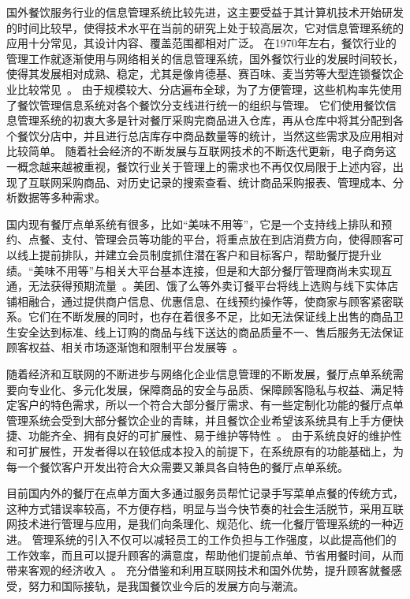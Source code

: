 国外餐饮服务行业的信息管理系统比较先进，这主要受益于其计算机技术开始研发的时间比较早，使得技术水平在当前的研究上处于较高层次，它对信息管理系统的应用十分常见，其设计内容、覆盖范围都相对广泛。
在1970年左右，餐饮行业的管理工作就逐渐使用与网络相关的信息管理系统，国外餐饮行业的发展时间较长，使得其发展相对成熟、稳定，尤其是像肯德基、赛百味、麦当劳等大型连锁餐饮企业比较常见~\cite{garrett2018mobile}。
由于规模较大、分店遍布全球，为了方便管理，这些机构率先使用了餐饮管理信息系统对各个餐饮分支线进行统一的组织与管理。
它们使用餐饮信息管理系统的初衷大多是针对餐厅采购完商品进入仓库，再从仓库中将其分配到各个餐饮分店中，并且进行总店库存中商品数量等的统计，当然这些需求及应用相对比较简单。
随着社会经济的不断发展与互联网技术的不断迭代更新，电子商务这一概念越来越被重视，餐饮行业关于管理上的需求也不再仅仅局限于上述内容，出现了互联网采购商品、对历史记录的搜索查看、统计商品采购报表、管理成本、分析数据等多种需求。

国内现有餐厅点单系统有很多，比如“美味不用等”，它是一个支持线上排队和预约、点餐、支付、管理会员等功能的平台，将重点放在到店消费方向，使得顾客可以线上提前排队，并建立会员制度抓住潜在客户和目标客户，帮助餐厅提升业绩。“美味不用等”与相关大平台基本连接，但是和大部分餐厅管理商尚未实现互通，无法获得预期流量~\cite{dev2004system}。美团、饿了么等外卖订餐平台将线上选购与线下实体店铺相融合，通过提供商户信息、优惠信息、在线预约操作等，使商家与顾客紧密联系。它们在不断发展的同时，也存在着很多不足，比如无法保证线上出售的商品卫生安全达到标准、线上订购的商品与线下送达的商品质量不一、售后服务无法保证顾客权益、相关市场逐渐饱和限制平台发展等~\cite{mueller1992customer}。

随着经济和互联网的不断进步与网络化企业信息管理的不断发展，餐厅点单系统需要向专业化、多元化发展，保障商品的安全与品质、保障顾客隐私与权益、满足特定客户的特色需求，所以一个符合大部分餐厅需求、有一些定制化功能的餐厅点单管理系统会受到大部分餐饮企业的青睐，并且餐饮企业希望该系统具有上手方便快捷、功能齐全、拥有良好的可扩展性、易于维护等特性~\cite{DBLP:journals/jbi/VelupillaiSLRSM18}。
由于系统良好的维护性和可扩展性，开发者得以在较低成本投入的前提下，在系统原有的功能基础上，为每一个餐饮客户开发出符合大众需要又兼具各自特色的餐厅点单系统。

目前国内外的餐厅在点单方面大多通过服务员帮忙记录手写菜单点餐的传统方式，这种方式错误率较高，不方便存档，明显与当今快节奏的社会生活脱节，采用互联网技术进行管理与应用，是我们向条理化、规范化、统一化餐厅管理系统的一种迈进。
管理系统的引入不仅可以减轻员工的工作负担与工作强度，以此提高他们的工作效率，而且可以提升顾客的满意度，帮助他们提前点单、节省用餐时间，从而带来客观的经济收入~\cite{scifo2009online}。
充分借鉴和利用互联网技术和国外优势，提升顾客就餐感受，努力和国际接轨，是我国餐饮业今后的发展方向与潮流。

